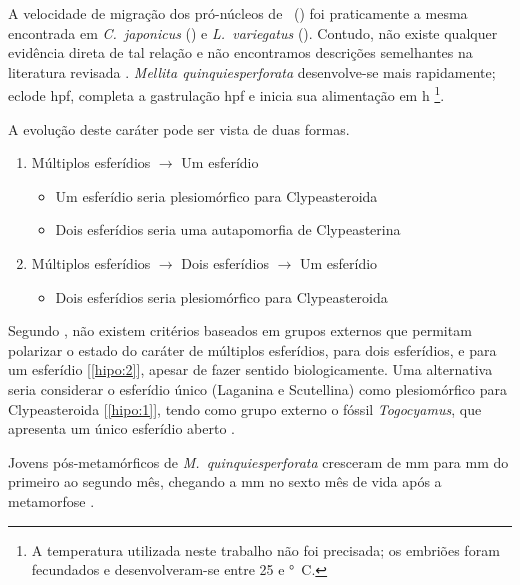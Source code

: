 A velocidade de migração dos pró-núcleos de \subdeshort\ () foi praticamente a mesma encontrada em \emph{C.~japonicus} () e \emph{L.~variegatus} ().
Contudo, não existe qualquer evidência direta de tal relação e não encontramos descrições semelhantes na literatura revisada \citep{Hamaguchi1980,Schatten1981,Pearse1991,Gilbert1997}.
\emph{Mellita quinquiesperforata} desenvolve-se mais rapidamente; eclode \unit[4]{hpf}, completa a gastrulação \unit[7]{hpf} e inicia sua alimentação em \unit[24]{h} \citep{Caldwell1972}\footnote{A temperatura utilizada neste trabalho não foi precisada; os embriões foram fecundados e desenvolveram-se entre 25 e \unit[28]{°C}.}.

A evolução deste caráter pode ser vista de duas formas.

\begin{enumerate}
  \item{Múltiplos esferídios $\longrightarrow$ Um esferídio}\label{hipo:1}
    \begin{itemize}
      \item{Um esferídio seria plesiomórfico para Clypeasteroida}
      \item{Dois esferídios seria uma autapomorfia de Clypeasterina}
    \end{itemize}
  \item{Múltiplos esferídios $\longrightarrow$ Dois esferídios $\longrightarrow$ Um esferídio}\label{hipo:2}
    \begin{itemize}
      \item{Dois esferídios seria plesiomórfico para Clypeasteroida}
    \end{itemize}
\end{enumerate}

Segundo \citet{Mooi1990}, não existem critérios baseados em grupos externos que permitam polarizar o estado do caráter de múltiplos esferídios, para dois esferídios, e para um esferídio [\ref{hipo:2}], apesar de fazer sentido biologicamente.
Uma alternativa seria considerar o esferídio único (Laganina e Scutellina) como plesiomórfico para Clypeasteroida [\ref{hipo:1}], tendo como grupo externo o fóssil \emph{Togocyamus}, que apresenta um único esferídio aberto \citep{Mooi1990}.

Jovens pós-metamórficos de \emph{M.~quinquiesperforata} cresceram de \unit[0,35]{mm} para \unit[3,80]{mm} do primeiro ao segundo mês, chegando a \unit[6,20]{mm} no sexto mês de vida após a metamorfose \citep{Caldwell1972}.

\clearpage{\pagestyle{empty}\cleardoublepage}
